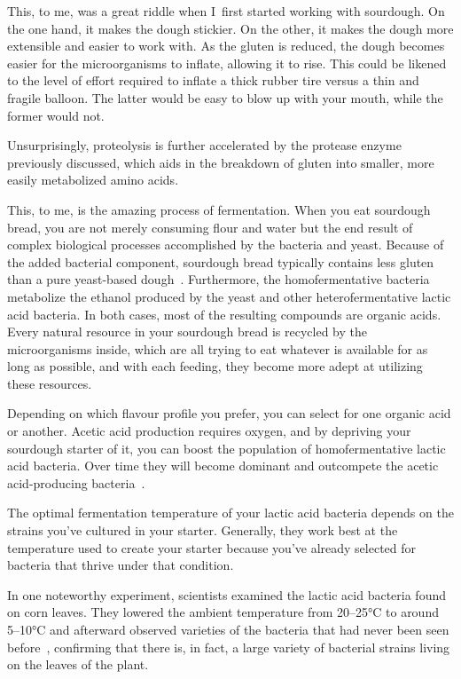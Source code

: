 This, to me, was a great riddle when I~first started working with sourdough.
On the one hand, it makes the dough stickier. On the other, it makes the dough
more extensible and easier to work with. As the gluten is reduced, the dough
becomes easier for the microorganisms to inflate, allowing it to rise. This
could be likened to the level of effort required to inflate a thick rubber tire
versus a thin and fragile balloon. The latter would be easy to blow up with
your mouth, while the former would not.

Unsurprisingly, proteolysis is further accelerated by the protease enzyme
previously discussed, which aids in the breakdown of gluten into smaller,
more easily metabolized amino acids.

This, to me, is the amazing process of fermentation. When you eat sourdough
bread, you are not merely consuming flour and water but the end result of
complex biological processes accomplished by the bacteria and yeast. Because
of the added bacterial component, sourdough bread typically contains less
gluten than a pure yeast-based dough~\cite{proteolysis+sourdough+bacteria}.
Furthermore, the homofermentative bacteria metabolize the ethanol produced by
the yeast and other heterofermentative lactic acid bacteria. In both cases,
most of the resulting compounds are organic acids. Every natural resource in
your sourdough bread is recycled by the microorganisms inside, which are all
trying to eat whatever is available for as long as possible, and with each
feeding, they become more adept at utilizing these resources.

Depending on which flavour profile you prefer, you can select for one organic
acid or another. Acetic acid production requires oxygen, and by depriving
your sourdough starter of it, you can boost the population of homofermentative
lactic acid bacteria. Over time they will become dominant and outcompete the
acetic acid-producing bacteria~\cite{acetic+acid+oxygen}.

The optimal fermentation temperature of your lactic acid bacteria depends on
the strains you've cultured in your starter. Generally, they work best at the
temperature used to create your starter because you've already selected for
bacteria that thrive under that condition.

In one noteworthy experiment, scientists examined the lactic acid bacteria
found on corn leaves. They lowered the ambient temperature from 20--25°C to around
5--10°C and afterward observed varieties of the bacteria that had never been
seen before~\cite{temperature+bacteria+corn}, confirming that there is, in
fact, a large variety of bacterial strains living on the leaves of the plant.

